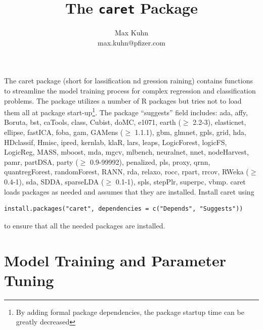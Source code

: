 \documentclass[12pt]{article}
\title{The {\tt caret} Package}
\author{Max Kuhn \\ max.kuhn@pfizer.com}
\newcommand{\pkg}[1]{{\fontseries{b}\selectfont #1}}
\renewcommand{\pkg}[1]{{\textsf{#1}}}
\begin{document}
\maketitle
\renewcommand{\baselinestretch}{.6}

\tableofcontents

\thispagestyle{empty}
	
\vspace{.2in}

\renewcommand{\baselinestretch}{1}
 
	
	


The \pkg{caret} package (short for
{\bf{\color{blue}{c}}}lassification {\bf{\color{blue}{a}}}nd
{\bf{\color{blue}{re}}}gression {\bf{\color{blue}{t}}}raining)
contains functions to streamline the model training process for
complex regression and classification problems. The package utilizes a
number of R packages but tries not to load them all at package
start-up\footnote{By adding formal package dependencies, the package
  startup time can be greatly decreased}. The package ``suggests''
field includes: \pkg{ada}, \pkg{affy}, \pkg{Boruta}, \pkg{bst}, \pkg{caTools}, \pkg{class}, \pkg{Cubist}, \pkg{doMC}, \pkg{e1071}, \pkg{earth ($\ge$ 2.2-3)}, \pkg{elasticnet}, \pkg{ellipse}, \pkg{fastICA}, \pkg{foba}, \pkg{gam}, \pkg{GAMens ($\ge$ 1.1.1)}, \pkg{gbm}, \pkg{glmnet}, \pkg{gpls}, \pkg{grid}, \pkg{hda}, \pkg{HDclassif}, \pkg{Hmisc}, \pkg{ipred}, \pkg{kernlab}, \pkg{klaR}, \pkg{lars}, \pkg{leaps}, \pkg{LogicForest}, \pkg{logicFS}, \pkg{LogicReg}, \pkg{MASS}, \pkg{mboost}, \pkg{mda}, \pkg{mgcv}, \pkg{mlbench}, \pkg{neuralnet}, \pkg{nnet}, \pkg{nodeHarvest}, \pkg{pamr}, \pkg{partDSA}, \pkg{party ($\ge$ 0.9-99992)}, \pkg{penalized}, \pkg{pls}, \pkg{proxy}, \pkg{qrnn}, \pkg{quantregForest}, \pkg{randomForest}, \pkg{RANN}, \pkg{rda}, \pkg{relaxo}, \pkg{rocc}, \pkg{rpart}, \pkg{rrcov}, \pkg{RWeka ($\ge$ 0.4-1)}, \pkg{sda}, \pkg{SDDA}, \pkg{sparseLDA ($\ge$ 0.1-1)}, \pkg{spls}, \pkg{stepPlr}, \pkg{superpc}, \pkg{vbmp}. \pkg{caret} loads
packages as needed and assumes that they are installed. Install
\pkg{caret} using  
\begin{Verbatim}
install.packages("caret", dependencies = c("Depends", "Suggests"))
\end{Verbatim}
to ensure that all the needed packages are installed.

\section{Model Training and Parameter Tuning}\label{S:train}
\end{document}
